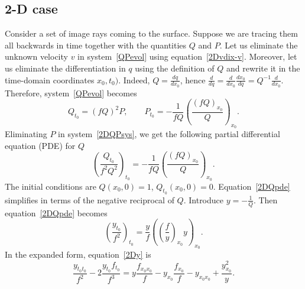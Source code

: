 \subsection{2-D case}
Consider a set of image rays coming to the surface.
Suppose we are tracing them all backwards in time 
together with the quantities $Q$ and $P$. 
Let us eliminate the unknown velocity $v$ in system~\ref{QPevol}
using equation~\ref{2Dvdix-v}. 
Moreover, let us eliminate the differentiation 
in $q$ using the definition
of $Q$ and rewrite it in the time-domain 
coordinates $x_0,t_0)$.
Indeed, $Q=\frac{dq}{dx_0}$, hence 
$\frac{d}{dq}=\frac{d}{dx_0}\frac{dx_0}{dq}=Q^{-1}\frac{d}{dx_0}$.
Therefore, system~\ref{QPevol} becomes
\begin{equation}
\label{2DQPsys}
Q_{t_0}=(fQ)^2P,\qquad 
P_{t_0}=-\frac{1}{fQ}\left(\frac{(fQ)_{x_0}}{Q}\right)_{x_0}.
\end{equation}
Eliminating $P$ in system~\ref{2DQPsys}, we get 
the following partial differential equation (PDE) for $Q$
\begin{equation}
\label{2DQpde}
\left(\frac{Q_{t_0}}{f^2Q^2}\right)_{t_0}=
-\frac{1}{fQ}\left(\frac{(fQ)_{x_0}}{Q}\right)_{x_0}.
\end{equation}
The initial conditions are $Q(x_0,0)=1$, $Q_{t_0}(x_0,0)=0$.
Equation~\ref{2DQpde} simplifies in terms of the negative 
reciprocal of $Q$. Introduce $y=-\frac{1}{Q}$. Then
equation~\ref{2DQpde} becomes
\begin{equation}
\label{2Dy}
\left(\frac{y_{t_0}}{f^2}\right)_{t_0}=
\frac{y}{f}\left(\left(\frac{f}{y}\right)_{x_0}y\right)_{x_0}.
\end{equation}
In the expanded form, equation~\ref{2Dy} is
\begin{equation}
\label{2Dyexpanded}
\frac{y_{t_0t_0}}{f^2}-2\frac{y_{t_0}f_{t_0}}{f^3}
=y\frac{f_{x_0x_0}}{f}-y_{x_0}\frac{f_{x_0}}{f}-y_{x_0x_0}+
\frac{y_{x_0}^2}{y}.
\end{equation}

